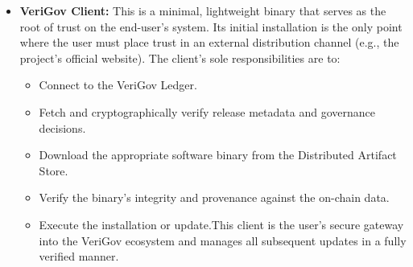 \documentclass{article}
\begin{document}
\begin{itemize}
\item \textbf{VeriGov Client:} This is a minimal, lightweight binary that serves as the root of trust on the end-user's system. Its initial installation is the only point where the user must place trust in an external distribution channel (e.g., the project's official website). The client's sole responsibilities are to:
\begin{itemize}
\item Connect to the VeriGov Ledger.
\item Fetch and cryptographically verify release metadata and governance decisions.
\item Download the appropriate software binary from the Distributed Artifact Store.
\item Verify the binary's integrity and provenance against the on-chain data.
\item Execute the installation or update.This client is the user's secure gateway into the VeriGov ecosystem and manages all subsequent updates in a fully verified manner.
\end{itemize}
\end{itemize}
\end{document}
